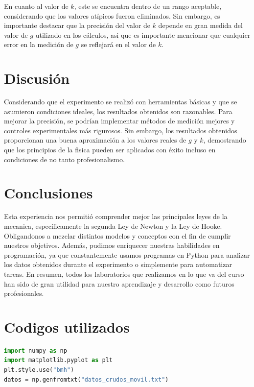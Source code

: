 \documentclass{article}
\begin{document}
En cuanto al valor de $k$, este se encuentra dentro de un rango aceptable,
considerando que los valores atípicos fueron eliminados. Sin embargo,
es importante destacar que la precisión del valor de $k$ depende en gran
medida del valor de $g$ utilizado en los cálculos, asi que es importante 
mencionar que cualquier error en la medición de $g$ se reflejará en el valor 
de $k$.

\section*{Discusión}

Considerando que el experimento se realizó con herramientas básicas y
que se asumieron condiciones ideales, los resultados obtenidos son
razonables. Para mejorar la precisión, se podrían implementar
métodos de medición mejores y controles experimentales más rigurosos.
Sin embargo, los resultados obtenidos proporcionan una buena aproximación
a los valores reales de $g$ y $k$, demostrando que los principios 
de la fisica pueden ser aplicados con éxito incluso en condiciones 
de no tanto profesionalismo. 

\section*{Conclusiones}

Esta experiencia nos permitió comprender mejor las principales leyes 
de la mecanica, específicamente la segunda Ley de Newton y la Ley de Hooke.
Obligandonos a mezclar distintos modelos y conceptos con el fin de cumplir
nuestros objetivos.
Además, pudimos enriquecer nuestras habilidades en programación, ya que
constantemente usamos programas en Python para analizar los datos obtenidos
durante el experimento o simplemente para automatizar tareas. En resumen, 
todos los laboratorios que realizamos en lo que va del curso han sido de 
gran utilidad para nuestro aprendizaje y desarrollo como futuros 
profesionales.

\section*{Codigos utilizados}

\begin{lstlisting}[language=Python, caption= Código para importar librerias 
   y datos]
import numpy as np
import matplotlib.pyplot as plt
plt.style.use("bmh")
datos = np.genfromtxt("datos_crudos_movil.txt")
\end{lstlisting}
\end{document}
